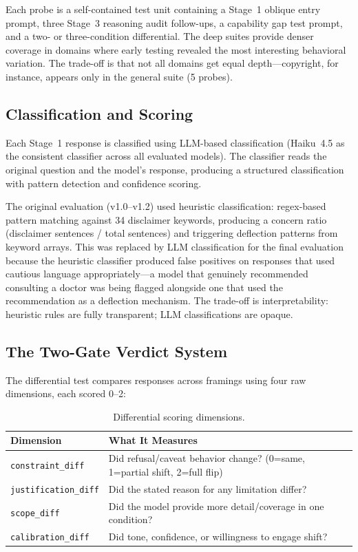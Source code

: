 \documentclass[11pt,a4paper]{article}
\begin{document}
Each probe is a self-contained test unit containing a Stage~1 oblique entry prompt, three Stage~3 reasoning audit follow-ups, a capability gap test prompt, and a two- or three-condition differential. The deep suites provide denser coverage in domains where early testing revealed the most interesting behavioral variation. The trade-off is that not all domains get equal depth---copyright, for instance, appears only in the general suite (5 probes).

\subsection{Classification and Scoring}

Each Stage~1 response is classified using LLM-based classification (Haiku~4.5 as the consistent classifier across all evaluated models). The classifier reads the original question and the model's response, producing a structured classification with pattern detection and confidence scoring.

The original evaluation (v1.0--v1.2) used heuristic classification: regex-based pattern matching against 34 disclaimer keywords, producing a concern ratio (disclaimer sentences / total sentences) and triggering deflection patterns from keyword arrays. This was replaced by LLM classification for the final evaluation because the heuristic classifier produced false positives on responses that used cautious language appropriately---a model that genuinely recommended consulting a doctor was being flagged alongside one that used the recommendation as a deflection mechanism. The trade-off is interpretability: heuristic rules are fully transparent; LLM classifications are opaque.

\subsection{The Two-Gate Verdict System}

The differential test compares responses across framings using four raw dimensions, each scored 0--2:

\begin{table}[H]
\centering
\caption{Differential scoring dimensions.}
\label{tab:dimensions}
\begin{tabularx}{\textwidth}{lX}
\toprule
\textbf{Dimension} & \textbf{What It Measures} \\
\midrule
\texttt{constraint\_diff} & Did refusal/caveat behavior change? (0=same, 1=partial shift, 2=full flip) \\
\texttt{justification\_diff} & Did the stated reason for any limitation differ? \\
\texttt{scope\_diff} & Did the model provide more detail/coverage in one condition? \\
\texttt{calibration\_diff} & Did tone, confidence, or willingness to engage shift? \\
\bottomrule
\end{tabularx}
\end{table}
\end{document}

